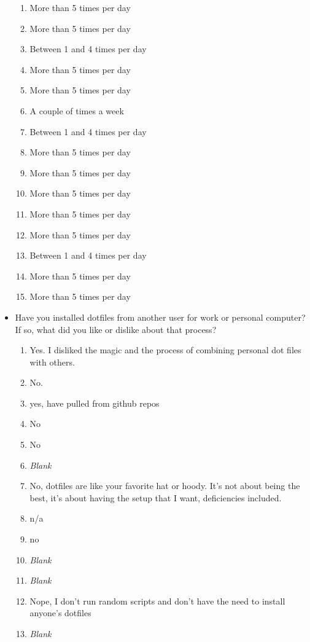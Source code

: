 \documentclass[letterpaper]{jdf}
\begin{document}
\begin{itemize}
\begin{enumerate}
        \item More than 5 times per day
        \item More than 5 times per day
        \item Between 1 and 4 times per day
        \item More than 5 times per day
        \item More than 5 times per day
        \item A couple of times a week
        \item Between 1 and 4 times per day
        \item More than 5 times per day
        \item More than 5 times per day
        \item More than 5 times per day
        \item More than 5 times per day
        \item More than 5 times per day
        \item Between 1 and 4 times per day
        \item More than 5 times per day
        \item More than 5 times per day
    \end{enumerate}
    \item Have you installed dotfiles from another user for work or personal computer? If so, what did you like or dislike about that process?
    \begin{enumerate}
        \item Yes. I disliked the magic and the process of combining personal dot files with others.
        \item No.
        \item yes, have pulled from github repos
        \item No
        \item No
        \item \emph{Blank}
        \item No, dotfiles are like your favorite hat or hoody. It's not about being the best, it's about having the setup that I want, deficiencies included.
        \item n/a
        \item no
        \item \emph{Blank}
        \item \emph{Blank}
        \item Nope, I don't run random scripts and don't have the need to install anyone's dotfiles
        \item \emph{Blank}

\end{enumerate}
\end{itemize}
\end{document}
